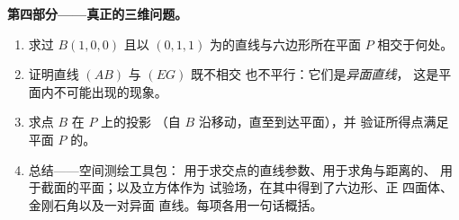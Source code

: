 \begin{problem}
\medskip
\noindent\textbf{第四部分——真正的三维问题。}
\begin{enumerate}[resume]
  \item 求过 $B(1,0,0)$ 且以
        $(0,1,1)$ 为的直线与六边形所在平面 $P$ 相交于何处。
  \item 证明直线 $(AB)$ 与 $(EG)$ 既不相交
        也不平行：它们是\emph{异面直线}，
        这是平面内不可能出现的现象。
  \item 求点 $B$ 在 $P$ 上的投影
        （自 $B$ 沿移动，直至到达平面），并
        验证所得点满足平面 $P$ 的。
  \item 总结——空间测绘工具包：
        用于求交点的直线参数、用于求角与距离的、
        用于截面的平面；以及立方体作为
        试验场，在其中得到了六边形、正
        四面体、金刚石角以及一对异面
        直线。每项各用一句话概括。
\end{enumerate}
\end{problem}
